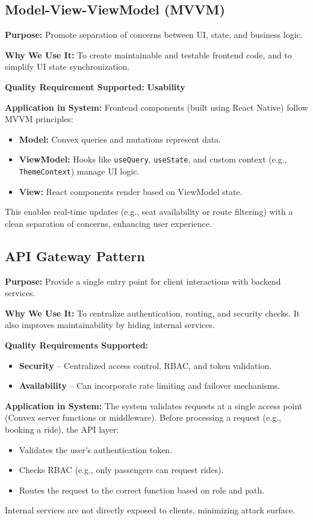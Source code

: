 \documentclass[12pt]{article}
\begin{document}
\subsection{Model-View-ViewModel (MVVM)}

\textbf{Purpose:} Promote separation of concerns between UI, state, and business logic.

\textbf{Why We Use It:} To create maintainable and testable frontend code, and to simplify UI state synchronization.

\textbf{Quality Requirement Supported:} \textbf{Usability}

\textbf{Application in System:}  
Frontend components (built using React Native) follow MVVM principles:
\begin{itemize}
  \item \textbf{Model:} Convex queries and mutations represent data.
  \item \textbf{ViewModel:} Hooks like \texttt{useQuery}, \texttt{useState}, and custom context (e.g., \texttt{ThemeContext}) manage UI logic.
  \item \textbf{View:} React components render based on ViewModel state.
\end{itemize}
This enables real-time updates (e.g., seat availability or route filtering) with a clean separation of concerns, enhancing user experience.

\subsection{API Gateway Pattern}

\textbf{Purpose:} Provide a single entry point for client interactions with backend services.

\textbf{Why We Use It:} To centralize authentication, routing, and security checks. It also improves maintainability by hiding internal services.

\textbf{Quality Requirements Supported:}
\begin{itemize}
  \item \textbf{Security} – Centralized access control, RBAC, and token validation.
  \item \textbf{Availability} – Can incorporate rate limiting and failover mechanisms.
\end{itemize}

\textbf{Application in System:}  
The system validates requests at a single access point (Convex server functions or middleware). Before processing a request (e.g., booking a ride), the API layer:
\begin{itemize}
  \item Validates the user's authentication token.
  \item Checks RBAC (e.g., only passengers can request rides).
  \item Routes the request to the correct function based on role and path.
\end{itemize}
Internal services are not directly exposed to clients, minimizing attack surface.
\end{document}
